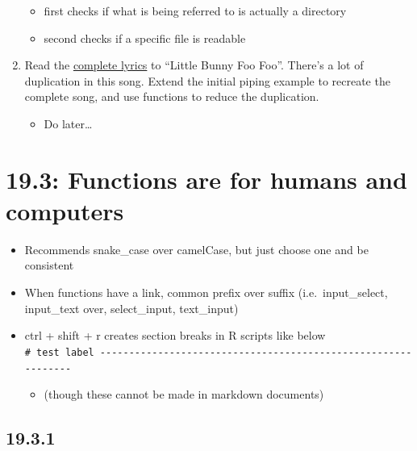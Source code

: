 \documentclass[]{book}
\providecommand{\tightlist}{%
  \setlength{\itemsep}{0pt}\setlength{\parskip}{0pt}}
\theoremstyle{definition}
\theoremstyle{definition}
\theoremstyle{definition}
\theoremstyle{remark}
\begin{document}
\begin{enumerate}
  \begin{itemize}
  \tightlist
  \item
    first checks if what is being referred to is actually a directory
  \item
    second checks if a specific file is readable
  \end{itemize}
\item
  Read the
  \href{https://en.wikipedia.org/wiki/Little_Bunny_Foo_Foo}{complete
  lyrics} to ``Little Bunny Foo Foo''. There's a lot of duplication in
  this song. Extend the initial piping example to recreate the complete
  song, and use functions to reduce the duplication.

  \begin{itemize}
  \tightlist
  \item
    Do later\ldots{}
  \end{itemize}
\end{enumerate}

\hypertarget{functions-are-for-humans-and-computers}{%
\section{19.3: Functions are for humans and
computers}\label{functions-are-for-humans-and-computers}}

\begin{itemize}
\tightlist
\item
  Recommends snake\_case over camelCase, but just choose one and be
  consistent
\item
  When functions have a link, common prefix over suffix
  (i.e.~input\_select, input\_text over, select\_input, text\_input)
\item
  ctrl + shift + r creates section breaks in R scripts like below\\
  \texttt{\#\ test\ label\ -\/-\/-\/-\/-\/-\/-\/-\/-\/-\/-\/-\/-\/-\/-\/-\/-\/-\/-\/-\/-\/-\/-\/-\/-\/-\/-\/-\/-\/-\/-\/-\/-\/-\/-\/-\/-\/-\/-\/-\/-\/-\/-\/-\/-\/-\/-\/-\/-\/-\/-\/-\/-\/-\/-\/-\/-\/-\/-\/-\/-\/-}

  \begin{itemize}
  \tightlist
  \item
    (though these cannot be made in markdown documents)
  \end{itemize}
\end{itemize}

\hypertarget{section-63}{%
\subsection{19.3.1}\label{section-63}}
\end{document}
